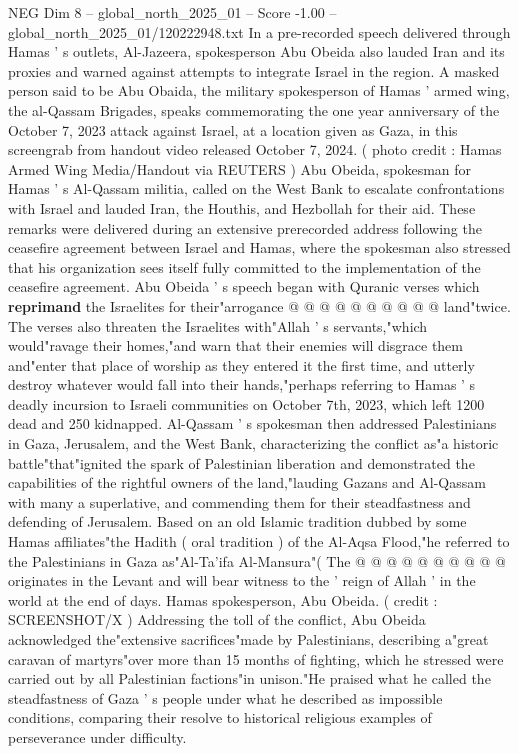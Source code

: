 \begin{textsample}{NEG Dim 8 – global\_north\_2025\_01 – Score -1.00 – global\_north\_2025\_01/120222948.txt}  \label{ex:f8_neg_345}
In a pre-recorded speech delivered through Hamas ' s outlets, Al-Jazeera, spokesperson Abu Obeida also lauded Iran and its proxies and warned against attempts to integrate Israel in the region.
A masked person said to be Abu Obaida, the military spokesperson of Hamas ' armed wing, the al-Qassam Brigades, speaks commemorating the one year anniversary of the October 7, 2023 attack against Israel, at a location given as Gaza, in this screengrab from handout video released October 7, 2024. ( photo credit : Hamas Armed Wing Media/Handout via REUTERS ) Abu Obeida, spokesman for Hamas ' s Al-Qassam militia, called on the West Bank to escalate confrontations with Israel and lauded Iran, the Houthis, and Hezbollah for their aid.
These remarks were delivered during an extensive prerecorded address following the ceasefire agreement between Israel and Hamas, where the spokesman also stressed that his organization sees itself fully committed to the implementation of the ceasefire agreement.
Abu Obeida ' s speech began with Quranic verses which \textbf{reprimand} the Israelites for their"arrogance @ @ @ @ @ @ @ @ @ @ land"twice.
The verses also threaten the Israelites with"Allah ' s servants,"which would"ravage their homes,"and warn that their enemies will disgrace them and"enter that place of worship as they entered it the first time, and utterly destroy whatever would fall into their hands,"perhaps referring to Hamas ' s deadly incursion to Israeli communities on October 7th, 2023, which left 1200 dead and 250 kidnapped.
Al-Qassam ' s spokesman then addressed Palestinians in Gaza, Jerusalem, and the West Bank, characterizing the conflict as"a historic battle"that"ignited the spark of Palestinian liberation and demonstrated the capabilities of the rightful owners of the land,"lauding Gazans and Al-Qassam with many a superlative, and commending them for their steadfastness and defending of Jerusalem.
Based on an old Islamic tradition dubbed by some Hamas affiliates"the Hadith ( oral tradition ) of the Al-Aqsa Flood,"he referred to the Palestinians in Gaza as"Al-Ta'ifa Al-Mansura"( The @ @ @ @ @ @ @ @ @ @ originates in the Levant and will bear witness to the ' reign of Allah ' in the world at the end of days.
Hamas spokesperson, Abu Obeida. ( credit : SCREENSHOT/X ) Addressing the toll of the conflict, Abu Obeida acknowledged the"extensive sacrifices"made by Palestinians, describing a"great caravan of martyrs"over more than 15 months of fighting, which he stressed were carried out by all Palestinian factions"in unison."He praised what he called the steadfastness of Gaza ' s people under what he described as impossible conditions, comparing their resolve to historical religious examples of perseverance under difficulty.

\end{textsample}
